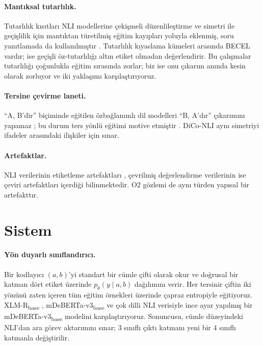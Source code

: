 \paragraph{Mantıksal tutarlılık.} Tutarlılık kısıtları NLI modellerine çekişmeli düzenlileştirme \citep{minervini2018adversarially} ve simetri ile geçişlilik için mantıktan türetilmiş eğitim kayıpları \citep{li2019logic} yoluyla eklenmiş, soru yanıtlamada da kullanılmıştır \citep{asai2020logic}. Tutarlılık kıyaslama kümeleri arasında BECEL \citep{jang2022becel} vardır; \citet{wu2025transitive} ise geçişli öz-tutarlılığı altın etiket olmadan değerlendirir. Bu çalışmalar tutarlılığı çoğunlukla eğitim sırasında zorlar; biz ise onu çıkarım anında kesin olarak zorluyor ve iki yaklaşımı karşılaştırıyoruz.
\paragraph{Tersine çevirme laneti.} ``A, B'dir'' biçiminde eğitilen özbağlanımlı dil modelleri ``B, A'dır'' çıkarımını yapamaz \citep{berglund2024reversal,lin2024delving}; bu durum ters yönlü eğitimi motive etmiştir \citep{golovneva2024reverse}. DiCo-NLI aynı simetriyi ifadeler arasındaki ilişkiler için sınar.
\paragraph{Artefaktlar.} NLI verilerinin etiketleme artefaktları \citep{gururangan2018annotation}, çevrilmiş değerlendirme verilerinin ise çeviri artefaktları \citep{artetxe2020translation} içerdiği bilinmektedir. O2 gözlemi de aynı türden yapısal bir artefakttır.

\section{Sistem}
\label{sec:method}

\paragraph{Yön duyarlı sınıflandırıcı.} Bir kodlayıcı $(a,b)$'yi standart bir cümle çifti olarak okur ve doğrusal bir katman dört etiket üzerinde $p_\theta(y \mid a,b)$ dağılımını verir. Her tersinir çiftin iki yönünü zaten içeren tüm eğitim örnekleri üzerinde çapraz entropiyle eğitiyoruz. XLM-R\textsubscript{base} \citep{conneau2020unsupervised}, mDeBERTa-v3\textsubscript{base} \citep{he2023debertav3} ve çok dilli NLI verisiyle \citep[XNLI ve makine çevirisiyle çoğaltılmış İngilizce NLI derlemleri;][]{conneau2018xnli,laurer2024less} ince ayar yapılmış bir mDeBERTa-v3\textsubscript{base} modelini karşılaştırıyoruz. Sonuncusu, cümle düzeyindeki NLI'dan ara görev aktarımını sınar; 3 sınıflı çıktı katmanı yeni bir 4 sınıflı katmanla değiştirilir.

